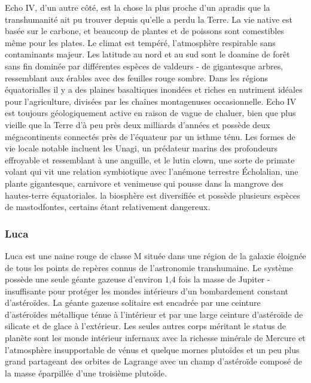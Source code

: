                                                                      Echo IV, d'un autre côté, est la chose la plus proche d'un apradis que la transhumanité ait pu trouver depuis qu'elle a perdu la Terre. La vie native est basée sur le carbone, et beaucoup de plantes et de poissons sont comestibles même pour les plates. Le climat est tempéré, l'atmosphère respirable sans contaminants majeur. Les latitude au nord et au sud sont le doamine de forêt sans fin dominée par différentes espèces de valdeurs - de gigantesque arbres, ressemblant aux érables avec des feuilles rouge sombre. Dans les régions équatorialles il y a des plaines basaltiques inondées et riches en nutriment idéales pour l'agriculture, divisées par les chaînes montagenuses occasionnelle. Echo IV est toujours géologiquement active en raison de vague de chaluer, bien que plus vieille que la Terre d'à peu près deux milliards d'années et possède deux mégacontinents connectés près de l'équateur par un isthme ténu. Les formes de vie locale notable incluent les Unagi, un prédateur marins des profondeurs effroyable et ressemblant à une anguille, et le lutin clown, une sorte de primate volant qui vit une relation symbiotique avec l'anémone terrestre Écholalian, une plante gigantesque, carnivore et venimeuse qui pousse dans la mangrove des hautes-terre équatoriales. la biosphère est diversifiée et possède plusieurs espèces de mastodfontes, certains étant relativement dangereux. 

                                                                     \subsubsection{Luca} \label{sec:luca} 

                                                                     Luca est une naine rouge de classe M située dans une région de la galaxie éloignée de tous les points de repères connus de l'astronomie transhumaine. Le système possède une seule géante gazeuse d'environ 1,4 fois la masse de Jupiter - insuffisante pour protéger les mondes intérieurs d'un bombardement constant d'astéroïdes. La géante gazeuse solitaire est encadrée par une ceinture d'astéroïdes métallique ténue à l'intérieur et par une large ceinture d'astéroïde de silicate et de glace à l'extérieur. Les seules autres corps méritant le status de planète sont les monde intérieur infernaux avec la richesse minérale de Mercure et l'atmosphère insupportable de vénus et quelque mornes plutoïdes et un peu plus grand partageant des orbites de Lagrange avec un champ d'astéroïde composé de la masse éparpillée d'une troisième plutoïde. 


